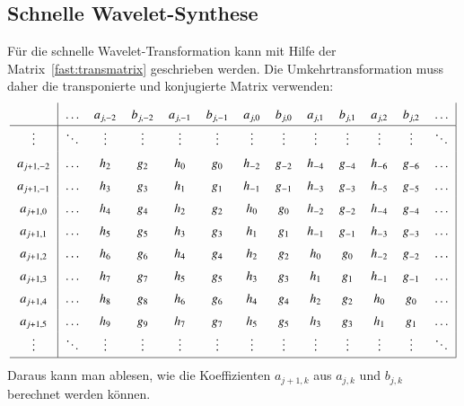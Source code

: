 \subsection{Schnelle Wavelet-Synthese}
Für die schnelle Wavelet-Transformation kann mit Hilfe der Matrix~\eqref{fast:transmatrix}
geschrieben werden.
Die Umkehrtransformation muss daher die transponierte und konjugierte Matrix verwenden:
\begin{equation}
\bgroup
\def\arraystretch{1.5}
\begin{tabular}{>{$}c<{$}|
>{$}c<{$}
>{$}c<{$}
>{$}c<{$}
>{$}c<{$}
>{$}c<{$}
>{$}c<{$}
>{$}c<{$}
>{$}c<{$}
>{$}c<{$}
>{$}c<{$}
>{$}c<{$}
>{$}c<{$}|}
          &\dots &a_{j,-2}&b_{j,-2}&a_{j,-1}&b_{j,-1}&a_{j,0}&b_{j,0}&a_{j,1}&b_{j,1}&a_{j,2}&b_{j,2}&\dots \\
\hline
\vdots    &\ddots&\vdots  &\vdots  &\vdots  &\vdots  &\vdots &\vdots &\vdots &\vdots &\vdots &\vdots &\ddots\\
a_{j+1,-2}&\dots &h_{ 2}  &g_{ 2}  &h_{ 0}  &g_{ 0}  &h_{-2} &g_{-2} &h_{-4} &g_{-4} &h_{-6} &g_{-6} &\dots \\
a_{j+1,-1}&\dots &h_{ 3}  &g_{ 3}  &h_{ 1}  &g_{ 1}  &h_{-1} &g_{-1} &h_{-3} &g_{-3} &h_{-5} &g_{-5} &\dots \\
a_{j+1, 0}&\dots &h_{ 4}  &g_{ 4}  &h_{ 2}  &g_{ 2}  &h_{ 0} &g_{ 0} &h_{-2} &g_{-2} &h_{-4} &g_{-4} &\dots \\
a_{j+1, 1}&\dots &h_{ 5}  &g_{ 5}  &h_{ 3}  &g_{ 3}  &h_{ 1} &g_{ 1} &h_{-1} &g_{-1} &h_{-3} &g_{-3} &\dots \\
a_{j+1, 2}&\dots &h_{ 6}  &g_{ 6}  &h_{ 4}  &g_{ 4}  &h_{ 2} &g_{ 2} &h_{ 0} &g_{ 0} &h_{-2} &g_{-2} &\dots \\
a_{j+1, 3}&\dots &h_{ 7}  &g_{ 7}  &h_{ 5}  &g_{ 5}  &h_{ 3} &g_{ 3} &h_{ 1} &g_{ 1} &h_{-1} &g_{-1} &\dots \\
a_{j+1, 4}&\dots &h_{ 8}  &g_{ 8}  &h_{ 6}  &g_{ 6}  &h_{ 4} &g_{ 4} &h_{ 2} &g_{ 2} &h_{ 0} &g_{ 0} &\dots \\
a_{j+1, 5}&\dots &h_{ 9}  &g_{ 9}  &h_{ 7}  &g_{ 7}  &h_{ 5} &g_{ 5} &h_{ 3} &g_{ 3} &h_{ 1} &g_{ 1} &\dots \\
\vdots    &\ddots&\vdots  &\vdots  &\vdots  &\vdots  &\vdots &\vdots &\vdots &\vdots &\vdots &\vdots &\ddots\\
\hline
\end{tabular}
\egroup
\end{equation}
Daraus kann man ablesen, wie die Koeffizienten $a_{j+1,k}$ aus $a_{j,k}$ und $b_{j,k}$
berechnet werden können.

